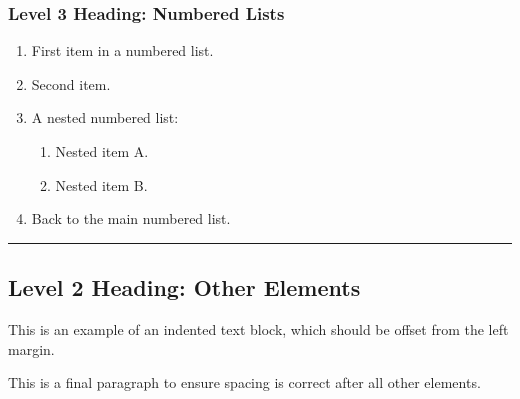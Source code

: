 \documentclass{article}
\begin{document}
\subsubsection{Level 3 Heading: Numbered Lists}


\begin{enumerate}
\item First item in a numbered list.
\item Second item.
\item A nested numbered list:
\begin{enumerate}
\item Nested item A.
\item Nested item B.
\end{enumerate}

\item Back to the main numbered list.
\end{enumerate}


\vspace{0.3cm}
\noindent\hrule
\vspace{0.3cm}

\subsection{Level 2 Heading: Other Elements}


This is an example of an indented text block, which should be offset from the left margin.

\hspace*{2em}{This text is indented.}

This is a final paragraph to ensure spacing is correct after all other elements.
\end{document}
